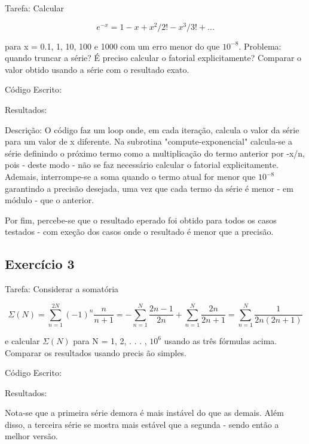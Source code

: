 \documentclass[12pt, a4paper]{article} %
\begin{document}
        Tarefa: Calcular

        \begin{equation} e^{-x} = 1 - x + x^2/2! - x^3/3! + ... \end{equation}

        para x = 0.1, 1, 10, 100 e 1000 com um erro menor do que $10^{-8}$. Problema: quando truncar a s\'erie? \'E preciso calcular o fatorial explicitamente? Comparar o valor obtido usando a s\'erie com o resultado exato.

        C\'odigo Escrito:
        

        Resultados:

        Descri\c{c}\~ao: O c\'odigo faz um loop onde, em cada itera\c{c}\~ao, calcula o valor da s\'erie para um valor de x diferente. Na subrotina "compute-exponencial" calcula-se a s\'erie definindo o pr\'oximo termo como a multiplica\c{c}\~ao do termo anterior por -x/n, pois - deste modo - n\~ao se faz necess\'ario calcular o fatorial explicitamente. Ademais, interrompe-se a soma quando o termo atual for menor que $10^{-8}$ garantindo a precis\~ao desejada, uma vez que cada termo da s\'erie \'e menor - em m\'odulo - que o anterior.

        Por fim, percebe-se que o resultado eperado foi obtido para todos os casos testados - com exe\c{c}\~ao dos casos onde o resultado \'e menor que a precis\~ao.

    \subsection{Exerc\'icio 3}

        Tarefa: Considerar a somat\'oria

        \begin{equation} \Sigma (N) = \sum_{n=1}^{2N} (-1)^n\frac{n}{n+1} = - \sum_{n=1}^N \frac{2n-1}{2n} + \sum_{n=1}^N \frac{2n}{2n+1} = \sum_{n=1}^N \frac{1}{2n(2n+1)} \end{equation}

        e calcular $\Sigma (N)$ para N = 1, 2, . . . , $10^6$ usando as tr\^es f\'ormulas acima. Comparar os resultados usando precis \~ao simples.

        C\'odigo Escrito:
        

        Resultados:

        Nota-se que a primeira s\'erie demora \'e mais inst\'avel do que as demais. Al\'em disso, a terceira s\'erie se mostra mais est\'avel que a segunda - sendo ent\~ao a melhor vers\~ao.
\end{document}
